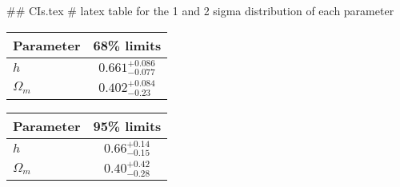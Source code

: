 ## CIs.tex
# latex table for the 1 and 2 sigma distribution of each parameter

\begin{tabular} { l  c}
 Parameter &  68\% limits\\
\hline
{\boldmath$h              $} & $0.661^{+0.086}_{-0.077}   $\\
{\boldmath$\Omega_m       $} & $0.402^{+0.084}_{-0.23}    $\\
\hline
\end{tabular}

\begin{tabular} { l  c}
 Parameter &  95\% limits\\
\hline
{\boldmath$h              $} & $0.66^{+0.14}_{-0.15}      $\\
{\boldmath$\Omega_m       $} & $0.40^{+0.42}_{-0.28}      $\\
\hline
\end{tabular}
